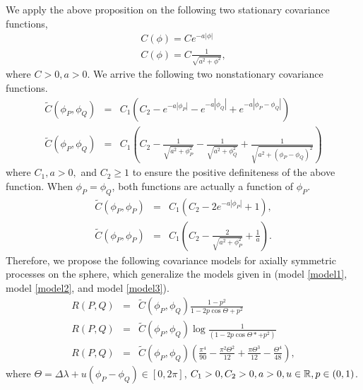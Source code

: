 					
We apply the above proposition on the following two stationary covariance functions, 							      		
			\begin{eqnarray*}
				C(\phi) = Ce^{-a|\phi|} \\
				C(\phi) = C\frac{1}{\sqrt{a^2+\phi^2}},
			\end{eqnarray*}
where $C > 0, a > 0$. We arrive the following two nonstationary covariance functions.  
			\begin{eqnarray}
				\label{Cm_model1}
				\tilde{C}(\phi_P, \phi_Q) &=& C_1(C_2 - e^{-a|\phi_P|} - e^{-a|\phi_Q|} + e^{-a|\phi_P - \phi_Q|}) \\
				\label{Cm_model2}
				\tilde{C}(\phi_P, \phi_Q) &=& C_1\left(C_2 - \frac{1}{\sqrt{a^2+\phi_P^2}} - \frac{1}{\sqrt{a^2+\phi_Q^2}} + \frac{1}{\sqrt{a^2+(\phi_P-\phi_Q)^2}}\right)
			\end{eqnarray}					      		
where $C_1, a > 0,$ and $C_2 \ge 1$ to ensure the positive definiteness of the above function. When $\phi_P = \phi_Q$, both functions are actually a function of $\phi_P$.		      		
			\begin{eqnarray*}
				\tilde{C}(\phi_P, \phi_P) &=& C_1(C_2 - 2e^{-a|\phi_P|} + 1), \\
				\tilde{C}(\phi_P, \phi_P) &=& C_1\left(C_2 - \frac{2}{\sqrt{a^2+\phi_P^2}} + \frac{1}{a}\right).
			\end{eqnarray*}		
Therefore, we propose the following covariance models for axially symmetric processes on the sphere, which generalize the models given in \cite{Huang2012} (model \ref{model1}, model \ref{model2}, and model \ref{model3}).
			\begin{eqnarray}
				R(P,Q) &=& \tilde{C}(\phi_P, \phi_Q) \frac{1-p^2}{1-2p \cos\Theta+p^2} \label{model4} \\
				R(P,Q) &=& \tilde{C}(\phi_P, \phi_Q) \log\frac{1}{(1-2p\cos\Theta* + p^2)} \label{model5} \\
				R(P,Q) &=& \tilde{C}(\phi_P, \phi_Q) \left(\frac{\pi^4}{90}-\frac{\pi^2\Theta^2}{12}+\frac{\pi\Theta^3}{12}-\frac{\Theta^4}{48}\right), \label{model6}
			\end{eqnarray}
where $\Theta=\Delta\lambda+u(\phi_P-\phi_Q) \in [0,2\pi ] $, $C_1 > 0, C_2 > 0, a>0, u\in \mathbb{R}, p\in(0,1)$. \\
					
